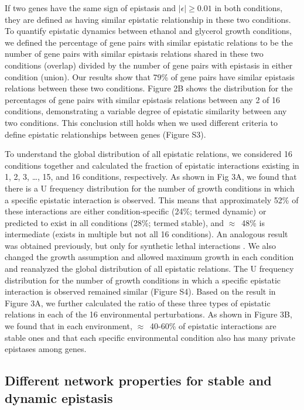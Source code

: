 If two genes have the same sign of epistasis and
$\left|\epsilon\right| \geq 0.01$ in both conditions, they are defined
as having similar epistatic
relationship in these two conditions. To quantify epistatic dynamics
between ethanol and glycerol growth conditions, we defined the
percentage of gene pairs with similar epistatic relations to be the
number of gene pairs with similar epistasis relations shared in these
two conditions (overlap) divided by the number of gene pairs with
epistasis in either condition (union). Our results show that 79\% of
gene pairs have similar epistasis relations between these two
conditions. Figure 2B shows the distribution for the percentages of
gene pairs with similar epistasis relations between any 2 of 16
conditions, demonstrating a variable degree of epistatic similarity
between any two conditions.  This conclusion still holds when we used
different criteria to define epistatic relationships between genes
(Figure S3).

To understand the global distribution of all epistatic relations, we
considered 16 conditions together and calculated the fraction of
epistatic interactions existing in 1, 2, 3, \ldots, 15, and 16
conditions, respectively. As shown in Fig 3A, we found that there is a
U frequency distribution for the number of growth conditions in which
a specific epistatic interaction is observed. This means that
approximately 52\% of these interactions are either condition-specific
(24\%; termed dynamic) or predicted to exist in all conditions (28\%;
termed stable), and $\approx$~48\% is intermediate (exists in multiple but not
all 16 conditions). An analogous result was obtained previously, but
only for synthetic lethal interactions \citep{Harrison2007}. We also changed the
growth assumption and allowed maximum growth in each condition and
reanalyzed the global distribution of all epistatic relations. The U
frequency distribution for the number of growth conditions in which a
specific epistatic interaction is observed remained similar (Figure
S4). Based on the result in Figure 3A, we further calculated the ratio
of these three types of epistatic relations in each of the 16
environmental perturbations. As shown in Figure 3B, we found that in
each environment, $\approx$~40-60\% of epistatic interactions are stable ones
and that each specific environmental condition also has many private
epistases among genes.

\subsection{Different network properties for stable and dynamic epistasis}

